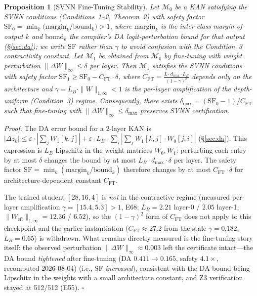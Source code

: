 \documentclass[journal,onecolumn]{IEEEtran}
\newtheorem{proposition}{Proposition}
\begin{document}
\begin{proposition}[SVNN Fine-Tuning Stability]
\label{prop:svnn-ft-stability}
Let $\mathcal{M}_0$ be a KAN satisfying the SVNN conditions
(Conditions~1--2, Theorem~2) with safety factor
$\mathrm{SF}_0 = \min_k \bigl(\text{margin}_k / \text{bound}_k\bigr) > 1$,
where $\text{margin}_k$ is the inter-class margin of output $k$ and
$\text{bound}_k$ the compiler's DA logit-perturbation bound for that
output ({\S}\ref{sec:da}); we write $\mathrm{SF}$ rather than $\gamma$
to avoid confusion with the Condition~3 contractivity constant. Let
$\mathcal{M}_1$ be obtained from $\mathcal{M}_0$ by fine-tuning with
weight perturbation $\|\Delta W\|_\infty \leq \delta$ per layer. Then
$\mathcal{M}_1$ satisfies the SVNN conditions with safety factor
$\mathrm{SF}_1 \geq \mathrm{SF}_0 - C_{\text{FT}} \cdot \delta$, where
$C_{\text{FT}} = \frac{L \cdot d_{\max} \cdot L_B}{(1-\gamma)^2}$
depends only on the architecture and $\gamma = L_B \cdot
\|W\|_{1,\infty} < 1$ is the per-layer amplification of the
depth-uniform (Condition~3) regime. Consequently, there exists
$\delta_{\max} = (\mathrm{SF}_0 - 1) / C_{\text{FT}}$ such that
fine-tuning with $\|\Delta W\|_\infty \leq \delta_{\max}$ preserves SVNN
certification.
\end{proposition}

\vspace{2pt}
\noindent\textit{Proof.}
The DA error bound for a 2-layer KAN is
$|\Delta z_k| \leq \varepsilon \cdot |\sum_j W_1[k,j]| +
\varepsilon \cdot L_B \cdot \sum_i |\sum_j W_1[k,j] \cdot W_0[j,i]|$
({\S}\ref{sec:da}). This expression is $L_B$-Lipschitz in the weight
matrices $W_0, W_1$: perturbing each entry by at most $\delta$ changes
the bound by at most $L_B \cdot d_{\max} \cdot \delta$ per layer. The
safety factor $\mathrm{SF} = \min_k (\text{margin}_k / \text{bound}_k)$
therefore changes by at most $C_{\text{FT}} \cdot \delta$ for
architecture-dependent constant $C_{\text{FT}}$.

The trained student $[28,16,4]$ is \emph{not} in the contractive
regime (measured per-layer amplification $\gamma = [15.4, 5.3] > 1$,
E68; $L_B = 2.21$ layer-0 / $2.05$ layer-1,
$\|W_{\text{eff}}\|_{1,\infty} = 12.36$ / $6.52$), so the
$(1-\gamma)^2$ form of $C_{\text{FT}}$ does not apply to this
checkpoint and the earlier instantiation ($C_{\text{FT}} \approx 27.2$
from the stale $\gamma = 0.182$, $L_B = 0.65$) is withdrawn.
What remains directly measured is the fine-tuning story itself: the
observed perturbation $\|\Delta W\|_\infty \approx 0.003$ left the
certificate intact---the DA bound \textit{tightened} after fine-tuning
(DA $0.411 \to 0.165$, safety $4.1\times$, recomputed 2026-08-04)
(i.e., $\mathrm{SF}$ \emph{increased}), consistent with the DA bound
being Lipschitz in the weights with a small architecture constant, and
Z3 verification stayed at 512/512 (E55). $\square$
\end{document}

